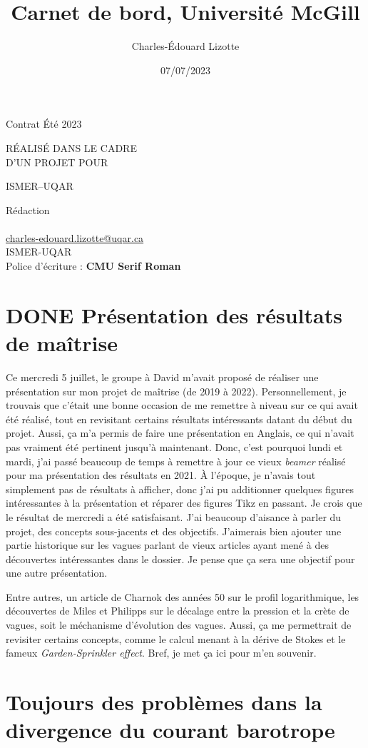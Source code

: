 \documentclass[10pt]{article}
\author{Charles-Édouard Lizotte}
\date{07/07/2023}
\title{Carnet de bord, Université McGill}
\makeatletter
\numberwithin{equation}{section}
\newcommand{\mytitlepage}{
\begin{titlepage}
\begin{center}
{\Huge \thesubtitle \par}
\vspace{2cm}
{\Huge \MakeUppercase{\thetitle} \par}
\vspace{2cm}
RÉALISÉ DANS LE CADRE\\ D'UN PROJET POUR \par
\vspace{2cm}
{\Huge ISMER--UQAR \par}
\vspace{2cm}
{\thedate}
\end{center}
\vfill
Rédaction \\
{\theauthor}\\
\url{charles-edouard.lizotte@uqar.ca}\\
ISMER-UQAR\\
Police d'écriture : \textbf{CMU Serif Roman}
\end{titlepage}
}
\newcommand{\thesubtitle}{Contrat Été 2023}
\makeatother
\begin{document}
\mytitlepage
\tableofcontents\newpage



\section{{\bfseries\sffamily DONE} Présentation des résultats de maîtrise}
\label{sec:org99db7f0}
Ce mercredi 5 juillet, le groupe à David m'avait proposé de réaliser une présentation sur mon projet de maîtrise (de 2019 à 2022).
Personnellement, je trouvais que c'était une bonne occasion de me remettre à niveau sur ce qui avait été réalisé, tout en revisitant certains résultats intéressants datant du début du projet.
Aussi, ça m'a permis de faire une présentation en Anglais, ce qui n'avait pas vraiment été pertinent jusqu'à maintenant.
Donc, c'est pourquoi lundi et mardi, j'ai passé beaucoup de temps à remettre à jour ce vieux \emph{beamer} réalisé pour ma présentation des résultats en 2021.
À l'époque, je n'avais tout simplement pas de résultats à afficher, donc j'ai pu additionner quelques figures intéressantes à la présentation et réparer des figures Tikz en passant.
Je crois que le résultat de mercredi a été satisfaisant.
J'ai beaucoup d'aisance à parler du projet, des concepts sous-jacents et des objectifs.
J'aimerais bien ajouter une partie historique sur les vagues parlant de vieux articles ayant mené à des découvertes intéressantes dans le dossier.
Je pense que ça sera une objectif pour une autre présentation.\bigskip

Entre autres, un article de Charnok des années 50 sur le profil logarithmique, les découvertes de Miles et Philipps sur le décalage entre la pression et la crète de vagues, soit le méchanisme d'évolution des vagues.
Aussi, ça me permettrait de revisiter certains concepts, comme le calcul menant à la dérive de Stokes et le fameux \emph{Garden-Sprinkler effect}.
Bref, je met ça ici pour m'en souvenir.

\section{Toujours des problèmes dans la divergence du courant barotrope}
\label{sec:orgb3bda97}
\end{document}
